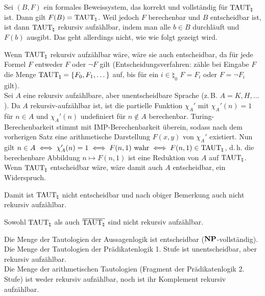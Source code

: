 \begin{Beweis}
    Sei $(B, F)$ ein formales Beweissystem, das korrekt und vollständig für $\text{TAUT}_\natural$ ist.
    Dann gilt $F(B) = \text{TAUT}_\natural$.
    Weil jedoch $F$ berechenbar und $B$ entscheidbar ist,
    ist dann $\text{TAUT}_\natural$ rekursiv aufzählbar, indem man alle $b \in B$ durchläuft und
    $F(b)$ ausgibt.
    Das geht allerdings nicht, wie wie folgt gezeigt wird.
    
    Wenn $\text{TAUT}_\natural$ rekursiv aufzählbar wäre, wäre sie auch entscheidbar,
    da für jede Formel $F$ entweder $F$ oder $\lnot F$ gilt
    (Entscheidungsverfahren: zähle bei Eingabe $F$ die Menge
    $\text{TAUT}_\natural = \{F_0, F_1, \dotsc\}$ auf, bis für ein $i \in \natural_0$
    $F = F_i$ oder $F = \lnot F_i$ gilt).\\
    Sei $A$ eine rekursiv aufzählbare, aber unentscheidbare Sprache (z.\,B. $A = K, H, \dotsc$).
    Da $A$ rekursiv-aufzählbar ist, ist die partielle Funktion $\chi_A'$ mit
    $\chi_A'(n) = 1$ für $n \in A$ und $\chi_A'(n)$ undefiniert für $n \notin A$ berechenbar.
    Turing-Berechenbarkeit stimmt mit IMP-Berechenbarkeit überein, sodass nach dem
    vorherigen Satz eine arithmetische Darstellung $F(x, y)$ von $\chi_A'$ existiert.
    Nun gilt $n \in A \iff \chi_A'(n) = 1 \iff F(n, 1) \text{ wahr} \iff
    F(n, 1) \in \text{TAUT}_\natural$, d.\,h. die berechenbare Abbildung $n \mapsto F(n, 1)$
    ist eine Reduktion von $A$ auf $\text{TAUT}_\natural$.
    Wenn $\text{TAUT}_\natural$ entscheidbar wäre, wäre damit auch $A$ entscheidbar, ein Widerspruch.
    
    Damit ist $\text{TAUT}_\natural$ nicht entscheidbar und nach obiger Bemerkung auch nicht rekursiv
    aufzählbar.
\end{Beweis}

\linie

\begin{Kor}
    Sowohl $\text{TAUT}_\natural$ als auch $\overline{\text{TAUT}_\natural}$ sind nicht rekursiv aufzählbar.
\end{Kor}

\begin{Bem}
    Die Menge der Tautologien der Aussagenlogik ist entscheidbar ($\mathbf{NP}$-vollständig).\\
    Die Menge der Tautologien der Prädikatenlogik 1. Stufe ist unentscheidbar, aber
    rekursiv aufzählbar.\\
    Die Menge der arithmetischen Tautologien (Fragment der Prädikatenlogik 2. Stufe)
    ist weder rekursiv aufzählbar, noch ist ihr Komplement rekursiv aufzählbar.
\end{Bem}

\pagebreak
